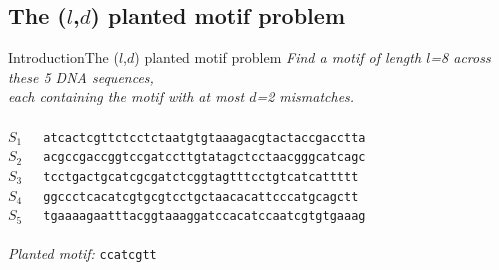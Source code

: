 \documentclass[pdf,xcolor={dvipsnames}]{beamer}
\begin{document}
	\subsection{The ($l$,$d$) planted motif problem}
	\begin{frame}{Introduction}{The ($l$,$d$) planted motif problem}
		{
		\centering
		\emph{Find a motif of length $l$=8 across these 5 DNA sequences,}\\
		\emph{each containing the motif with at most $d$=2 mismatches.}\\
		\ \\
		\small
		$S_1$\ \ \  \texttt{at{\color{blue}c{ac}tcgtt}ctcctctaatgtgtaaagacgtactaccgacctta}\\
		$S_2$\ \ \  \texttt{acgccgaccggtc{\color{blue}c{g}atc{c}tt}gtatagctcctaacgggcatcagc}\\
		$S_3$\ \ \  \texttt{tcctgactgcatcgcgatctcggtagtttcctgt{\color{blue}{t}catc{a}tt}ttt}\\
		$S_4$\ \ \  \texttt{ggccctca{\color{blue}{g}catcgt{g}}cgtcctgctaacacattcccatgcagctt}\\
		$S_5$\ \ \  \texttt{tgaaaagaatttacggtaaaggatccacatc{\color{blue}c{a}atcgt{g}}tgaaag}\\ 
		\ \\
		\emph{Planted motif: }\texttt{\color{blue}ccatcgtt}\\
		\ \\
		}

		\end{frame}
\end{document}
